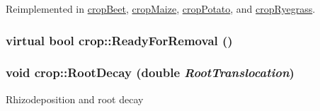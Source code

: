 Reimplemented in \hyperlink{classcrop_beet_a0d8bc5bc5f448342e8dd52824443ab63}{cropBeet}, \hyperlink{classcrop_maize_aad7767146cabf892674c77190b6782ef}{cropMaize}, \hyperlink{classcrop_potato_ac3aabdce7024004252aec7b0c150ddf3}{cropPotato}, and \hyperlink{classcrop_ryegrass_a621ec6683bbbf9ff717db7c9a428e722}{cropRyegrass}.\hypertarget{classcrop_a499e790eeeb926cff4529a98458b1419}{
\subsubsection[{ReadyForRemoval}]{\setlength{\rightskip}{0pt plus 5cm}virtual bool crop::ReadyForRemoval ()}}
\label{classcrop_a499e790eeeb926cff4529a98458b1419}
\hypertarget{classcrop_ae8be0fd1bc438d926ce68942cb0886a0}{
\subsubsection[{RootDecay}]{\setlength{\rightskip}{0pt plus 5cm}void crop::RootDecay (double {\em RootTranslocation})}}
\label{classcrop_ae8be0fd1bc438d926ce68942cb0886a0}
Rhizodeposition and root decay 

